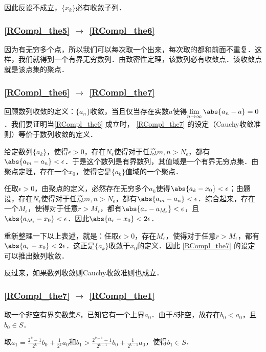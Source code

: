 因此反设不成立，$\{x_k\}$必有收敛子列．

\subsubsection{\autoref{RCompl_the5} $\to$ \autoref{RCompl_the6} }

因为有无穷多个点，所以我们可以每次取一个出来，每次取的都和前面不重复．这样，我们就得到一个有界无穷数列．由致密性定理，该数列必有收敛点．该收敛点就是该点集的聚点．



\subsubsection{\autoref{RCompl_the6} $\to$ \autoref{RCompl_the7} }

回顾数列收敛的定义：$\{a_n\}$收敛，当且仅当存在实数$a$使得$\lim\limits_{n\to \infty}\abs{a_n-a}=0$．我们要证明当\autoref{RCompl_the6} 成立时， \autoref{RCompl_the7} 的设定（Cauchy收敛准则）等价于数列收敛的定义．

给定数列$\{a_k\}$，使得$\epsilon>0$，存在$N_\epsilon$使得对于任意$m, n>N_\epsilon$，都有$\abs{a_m-a_n}<\epsilon$．于是这个数列是有界数列，其值域是一个有界无穷点集．由聚点定理，存在一个$x_0$，使得它是$\{a_k\}$值域的一个聚点．

任取$\epsilon>0$，由聚点的定义，必然存在无穷多个$a_k$使得$\abs{a_k-x_0}<\epsilon$；由题设，存在$N_\epsilon$使得对于任意$m, n>N_\epsilon$，都有$\abs{a_m-a_n}<\epsilon$．综合起来，存在一个$M_\epsilon$，使得对于任意$r>M_\epsilon$，都有$\abs{a_r-a_{M_\epsilon}}<\epsilon$，且$\abs{a_{M_\epsilon}-x_0}<\epsilon$．因此$\abs{a_r-x_0}<2\epsilon$．

重新整理一下以上表述，就是：任取$\epsilon>0$，存在$M_\epsilon$，使得对于任意$r>M_\epsilon$，都有$\abs{a_r-x_0}<2\epsilon$．这正是$\{a_k\}$收敛于$x_0$的定义．因此 \autoref{RCompl_the7} 的设定可以推出数列收敛．

反过来，如果数列收敛则Cauchy收敛准则也成立．


\subsubsection{\autoref{RCompl_the7} $\to$ \autoref{RCompl_the1} }

取一个非空有界实数集$S$，已知它有一个上界$a_0$．由于$S$非空，故存在$b_0<a_0$，且$b_0\in S$．

取$a_1=\frac{2^k-1}{2^k}b_0+\frac{1}{2^k}a_0$和$b_1>\frac{2^{k-1}-1}{2^{k-1}}b_0+\frac{1}{2^{k-1}}a_0$，使得$b_1\in S$．



















